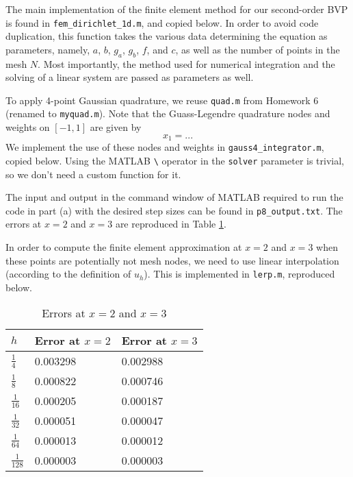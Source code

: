 \documentclass{homework}
\begin{document}
	\question 
	\begin{alphaparts}
		\questionpart 
		The main implementation of the finite element method for our second-order BVP is found in \verb*|fem_dirichlet_1d.m|, and copied below. In order to avoid code duplication, this function takes the various data determining the equation as parameters, namely, $a$, $b$, $g_a$, $g_b$, $f$, and $c$, as well as the number of points in the mesh $N$. Most importantly, the method used for numerical integration and the solving of a linear system are passed as parameters as well.	
		
		
		To apply 4-point Gaussian quadrature, we reuse \verb*|quad.m| from Homework 6 (renamed to \verb*|myquad.m|). Note that the Guass-Legendre quadrature nodes and weights on $[-1,1]$ are given by
		\begin{equation}
			x_1 = ...
		\end{equation}
		We implement the use of these nodes and weights in \verb*|gauss4_integrator.m|, copied below. Using the MATLAB \verb*|\| operator in the \verb*|solver| parameter is trivial, so we don't need a custom function for it.
		
		
		\questionpart
		The input and output in the command window of MATLAB required to run the code in part (a) with the desired step sizes can be found in \verb*|p8_output.txt|. The errors at $x=2$ and $x=3$ are reproduced in Table \ref{table:errors23}.
		
		In order to compute the finite element approximation at $x=2$ and $x=3$ when these points are potentially not mesh nodes, we need to use linear interpolation (according to the definition of $u_h$). This is implemented in \verb*|lerp.m|, reproduced below.
		
		\begin{table}[h]
			\centering
			\begin{tabular}{@{}lll@{}}
				\toprule
				$h$ & Error at $x=2$ & Error at $x=3$ \\
				\midrule
				$\frac{1}{4}$ & 0.003298 & 0.002988 \\[.4em]
				$\frac{1}{8}$ & 0.000822 & 0.000746 \\[.4em]
				$\frac{1}{16}$ & 0.000205 & 0.000187 \\[.4em]
				$\frac{1}{32}$ & 0.000051 & 0.000047 \\[.4em]
				$\frac{1}{64}$ & 0.000013 & 0.000012 \\[.4em]
				$\frac{1}{128}$ & 0.000003 & 0.000003 \\[.4em]
				\bottomrule
			\end{tabular}
			\caption{Errors at $x=2$ and $x=3$}
			\label{table:errors23}
		\end{table}
	\end{alphaparts}
	
\end{document}
